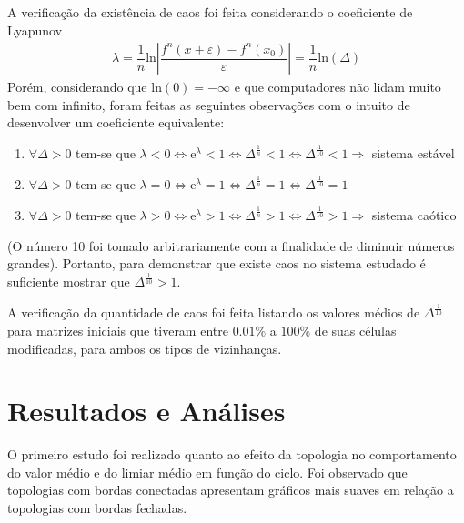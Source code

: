 \documentclass[
	12pt,				%
	openright,			%
	twoside,			%
	a4paper,			%
	english,			%
	french,				%
	spanish,			%
	brazil				%
	]{abntex2}
\begin{document}
  A verificação da existência de caos foi feita considerando o coeficiente de Lyapunov
  \begin{align}
    \lambda = \dfrac{1}{n} \mathrm{ln}\left|\dfrac{f^n(x+\varepsilon) - f^n(x_0)}{\varepsilon}\right| = \dfrac{1}{n} \mathrm{ln}(\Delta)
  \end{align}
  Porém, considerando que $\mathrm{ln}(0)=-\infty$ e que computadores não lidam muito bem com infinito, foram feitas as seguintes observações com o intuito de desenvolver um coeficiente equivalente:
  \begin{enumerate}
    \item $\forall \Delta > 0$ tem-se que $\lambda < 0 \Leftrightarrow \mathrm{e}^\lambda < 1 \Leftrightarrow \Delta^\frac{1}{n} < 1 \Leftrightarrow \Delta^\frac{1}{10} < 1 \Rightarrow$ sistema estável 
    \item $\forall \Delta > 0$ tem-se que $\lambda = 0 \Leftrightarrow \mathrm{e}^\lambda = 1 \Leftrightarrow \Delta^\frac{1}{n} = 1 \Leftrightarrow \Delta^\frac{1}{10} = 1$ 
    \item $\forall \Delta > 0$ tem-se que $\lambda > 0 \Leftrightarrow \mathrm{e}^\lambda > 1 \Leftrightarrow \Delta^\frac{1}{n} > 1 \Leftrightarrow \Delta^\frac{1}{10} > 1 \Rightarrow$ sistema caótico 
  \end{enumerate}
 (O número 10 foi tomado arbitrariamente com a finalidade de diminuir números grandes). Portanto, para demonstrar que existe caos no sistema estudado é suficiente mostrar que $\Delta^\frac{1}{10} > 1$. 
 
 A verificação da quantidade de caos foi feita listando os valores médios de $\Delta^\frac{1}{10}$ para matrizes iniciais que tiveram entre $0.01\%$ a $100\%$ de suas células modificadas, para ambos os tipos de vizinhanças.

\chapter{Resultados e Análises}

O primeiro estudo foi realizado quanto ao efeito da topologia no comportamento do valor médio e do limiar médio em função do ciclo. Foi observado que topologias com bordas conectadas apresentam gráficos mais suaves em relação a topologias com bordas fechadas. %

%
\end{document}
